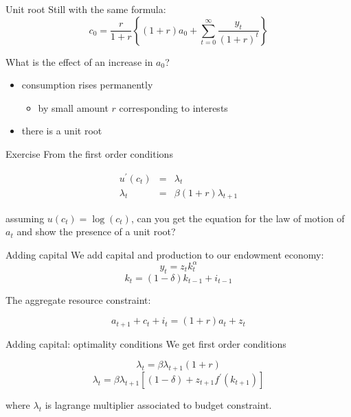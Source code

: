 \documentclass[
  ignorenonframetext,
]{beamer}
\providecommand{\tightlist}{%
  \setlength{\itemsep}{0pt}\setlength{\parskip}{0pt}}\usepackage{longtable,booktabs,array}
\begin{document}
\begin{frame}{Unit root}
\label{unit-root}
Still with the same formula:
\[c_0 = \frac{r}{1+r}\left\{ (1+r) a_0 + \sum_{t=0}^{\infty} \frac{y_t}{(1+r)^t}\right\}\]

What is the effect of an increase in \(a_0\)?

\begin{itemize}
\tightlist
\item
  consumption rises permanently

  \begin{itemize}
  \tightlist
  \item
    by small amount \(r\) corresponding to interests
  \end{itemize}
\item
  there is a unit root
\end{itemize}
\end{frame}

\begin{frame}{Exercise}
\label{exercise}
From the first order conditions

\begin{align}
u^{\prime}(c_t) & = & \lambda_t \\
\lambda_t & = &  \beta (1+r) \lambda_{t+1}
\end{align}

assuming \(u(c_t) = \log (c_t)\), can you get the equation for the law
of motion of \(a_t\) and show the presence of a unit root?
\end{frame}

\begin{frame}{Adding capital}
\label{adding-capital}
We add capital and production to our endowment economy:
\[y_t = z_t k_t^\alpha\] \[k_t = (1-\delta) k_{t-1} + i_{t-1}\]

The aggregate resource constraint:

\[a_{t+1} + c_t + i_t = (1+r) a_t + z_t\]
\end{frame}

\begin{frame}{Adding capital: optimality conditions}
\label{adding-capital-optimality-conditions}
We get first order conditions

\[\lambda_t = \beta \lambda_{t+1} (1+r)\]
\[\lambda_t = \beta \lambda_{t+1}\left[ (1-\delta) + z_{t+1} f^{\prime}(k_{t+1}) \right]\]

where \(\lambda_t\) is lagrange multiplier associated to budget
constraint.
\end{frame}
\end{document}
